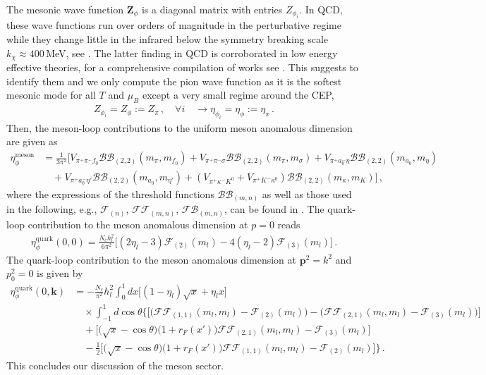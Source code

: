 \documentclass[reprint,twocolumn,superscriptaddress,preprintnumbers,amsmath,amssymb,aps,prd,floatfix]{revtex4-2}
\begin{document}
The mesonic wave function $\boldsymbol{Z}_\phi$ is a diagonal matrix with entries $Z_{\phi_i}$. In QCD, these wave functions run over orders of magnitude in the perturbative regime while they change little in the infrared below the symmetry breaking scale $k_\chi\approx 400$\,MeV, see \cite{Ihssen:2024miv}. The latter finding in QCD is corroborated in low energy effective theories, for a comprehensive compilation of works see \cite{Dupuis:2020fhh}. This suggests to identify them and we only compute the pion wave function as it is the softest mesonic mode for all $T$ and $\mu_B$ except a very small regime around the CEP, 
%
\begin{align} 
	Z_{\phi_i}=Z_\phi:=Z_\pi\,,\quad \forall i \quad \longrightarrow \eta_{\phi_i}=\eta_\phi:=\eta_\pi\,.
\label{eq:OneZphi}
\end{align}
%
Then, the meson-loop contributions to the uniform meson anomalous dimension are given as
%
\begin{align}
\eta^{\textrm{meson}}_{\phi}&=\frac{1}{3 \pi^2} \bigg [  V_{\pi^{+} \pi^{-} f_0} \mathcal{BB}_{(2,2)} (m_{\pi},m_{f_0})+  V_{\pi^{+} \pi^{-} \sigma}\mathcal{BB}_{(2,2)} (m_{\pi},m_{\sigma})  +  V_{\pi^{+} a_0^{-} \eta}\mathcal{BB}_{(2,2)} (m_{a_0},m_{\eta})\nonumber\\[1ex]
&\quad+ V_{\pi^{+} a_0^{-} \eta'}\mathcal{BB}_{(2,2)} (m_{a_0},m_{\eta'}) 
+(V_{\pi^{+} \kappa^{-} K^0}+V_{\pi^{+}K^{-}\kappa^0}) \mathcal{BB}_{(2,2)} (m_{\kappa},m_{K}) \bigg ]\,,\nonumber
\end{align}
%
where the expressions of the threshold functions $\mathcal{BB}_{(m,n)}$ as well as those used in the following, e.g., $\mathcal{F}_{(n)}$, $\mathcal{FF}_{(m,n)}$, $\mathcal{FB}_{(m,n)}$, can be found in \cite{Fu:2019hdw}. The quark-loop contribution to the meson anomalous dimension at $p=0$ reads
\begin{align}
\eta^\textrm{quark}_{\phi}(0,0)= \frac{N_{c}{h}_{l}^{2}}{6\pi^2}\bigg[(2\eta_{l}-3)\mathcal{F}_{(2)}(
    {m}_{l}) -4(\eta_{l}-2)\mathcal{F}_{(3)}({m}_{l})\bigg]\,.
\end{align}
The quark-loop contribution to the meson anomalous dimension at $\bm p^2= k^2$ and $p_0^2=0$ is given by
\begin{align}
\eta^\textrm{quark}_{\phi}(0,\bm k)&= -\frac{N_{c}}{\pi^2} h_l^2\int_0^1 d x\bigg[(1-\eta_{l}) \sqrt x
    +\eta_{l} x\bigg]\nonumber\\
  &\quad\times \int_{-1}^1 d \cos \theta\Bigg\{\bigg[
    \Big(\mathcal{FF}_{(1,1)}({m}_{l},
   {m}_{l})-\mathcal{F}_{(2)}(
    {m}_{l}) \Big)-\Big(\mathcal{FF}_{(2,1)}({m}_{l},
    {m}_{l})-\mathcal{F}_{(3)}({m}_{l})\Big)\bigg] \nonumber \\[1ex]
  &\quad+\bigg[\Big(\sqrt x -\cos \theta\Big)
    \Big(1+r_F(x')\Big)\mathcal{FF}_{(2,1)}(
    {m}_{l},{m}_{l})-\mathcal{F}_{(3)}({m}_{l})\bigg]\nonumber \\[1ex]
  &\quad -\frac{1}{2}\bigg[\Big(\sqrt x -\cos \theta\Big)
    \Big(1+r_F(x')\Big)\mathcal{FF}_{(1,1)}({m}_{l},{m}_{l}) -\mathcal{F}_{(2)}({m}_{l})\bigg]\Bigg\}\,.
\end{align}
%
This concludes our discussion of the meson sector. 
\end{document}
